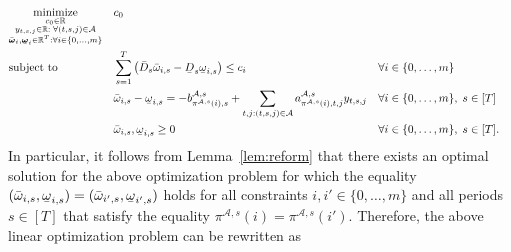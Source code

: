 \documentclass[nonblindrev,mnsc]{informs3} %
\newcommand{\bomega}{{\boldsymbol{\omega}}}
\def\Real{\mathbb{R}}
\let\R\Real
\newcommand{\ubar}[1]{\text{\b{$#1$}}}
\begin{document}
\begin{equation*}  
\begin{aligned}
&\underset{\substack{c_0 \in \R\\y_{t,s,j} \in \R :\;  \forall (t,s,j) \in \mathcal{A}\\ \bar{\bomega}_i, \ubar{\bomega}_i \in \R^T: \forall i \in \{0,\ldots,m\}}}{\textnormal{minimize}}&& c_0 \\
&\textnormal{subject to}&&\sum_{s =1}^T \left(  \bar{D}_s  \bar{\omega}_{i,s}  - \ubar{D}_s \ubar{\omega}_{i,s} \right) \le c_i  && \forall i \in \{0,\ldots,m\} \\
    &&& \bar{\omega}_{i,s} - \ubar{\omega}_{i,s} =   - b^{\mathcal{A},s}_{\pi^{\mathcal{A},s}(i),s} + \sum_{t,j: (t,s,j) \in \mathcal{A}} a^{\mathcal{A},s}_{\pi^{\mathcal{A},s}(i),t,j} y_{t,s,j}  && \forall i \in  \{0,\ldots,m  \}, \;s \in [T] \\
    &&&  \bar{\omega}_{i,s}, \ubar{\omega}_{i,s} \ge 0 && \forall i \in \{0,\ldots,m\}, \; s \in [T].
\end{aligned}
\end{equation*}
In particular, it follows from Lemma~\ref{lem:reform} that there exists an optimal solution for the above optimization problem for which the equality  $(\bar{\omega}_{i,s}, \ubar{\omega}_{i,s}) = (\bar{\omega}_{i',s}, \ubar{\omega}_{i',s})$ holds for all constraints $i,i' \in \{0,\ldots,m\}$ and all periods $s \in [T]$ that satisfy the equality  $\pi^{\mathcal{A},s}(i) = \pi^{\mathcal{A},s}(i')$. Therefore, the above linear optimization problem can be rewritten as 
\end{document}
